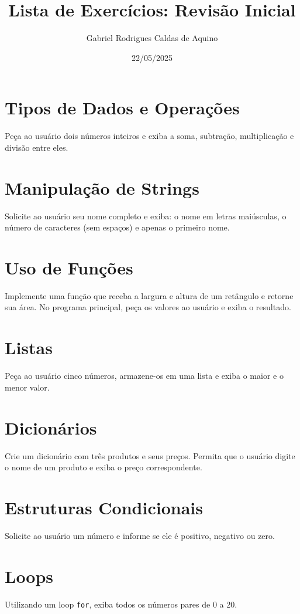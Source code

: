 \title{Lista de Exercícios: Revisão Inicial}
\author{Gabriel Rodrigues Caldas de Aquino}
\date{22/05/2025}



\maketitle

\section{Tipos de Dados e Operações}
Peça ao usuário dois números inteiros e exiba a soma, subtração, multiplicação e divisão entre eles.

\section{Manipulação de Strings}
Solicite ao usuário seu nome completo e exiba: o nome em letras maiúsculas, o número de caracteres (sem espaços) e apenas o primeiro nome.

\section{Uso de Funções}
Implemente uma função que receba a largura e altura de um retângulo e retorne sua área. No programa principal, peça os valores ao usuário e exiba o resultado.

\section{Listas}
Peça ao usuário cinco números, armazene-os em uma lista e exiba o maior e o menor valor.

\section{Dicionários}
Crie um dicionário com três produtos e seus preços. Permita que o usuário digite o nome de um produto e exiba o preço correspondente.

\section{Estruturas Condicionais}
Solicite ao usuário um número e informe se ele é positivo, negativo ou zero.

\section{Loops}
Utilizando um loop \texttt{for}, exiba todos os números pares de 0 a 20.

